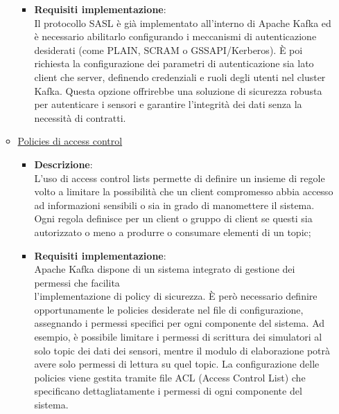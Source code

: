 \documentclass[10pt]{article}
\begin{document}
\begin{itemize}
\begin{itemize}
\begin{itemize}
                    \item \textbf{Requisiti implementazione}:\\
                    Il protocollo SASL è già implementato all'interno di Apache Kafka ed è necessario abilitarlo configurando i meccanismi di autenticazione desiderati (come PLAIN, SCRAM o GSSAPI/Kerberos).
                    È poi richiesta la configurazione dei parametri di autenticazione sia lato client che server, definendo credenziali e ruoli degli utenti nel cluster Kafka.
                    Questa opzione offrirebbe una soluzione di sicurezza robusta per autenticare i sensori e garantire l'integrità dei dati senza la necessità di contratti.

                \end{itemize}

                \item \underline{Policies di access control}
                \begin{itemize}
                    \item \textbf{Descrizione}:\\
                    L'uso di access control lists permette di definire un insieme di regole volto a limitare la possibilità che un client compromesso abbia accesso ad informazioni sensibili o sia in grado di manomettere il sistema.
                    Ogni regola definisce per un client o gruppo di client se questi sia autorizzato o meno a produrre o consumare elementi di un topic;

                    \item \textbf{Requisiti implementazione}:\\
                    Apache Kafka dispone di un sistema integrato di gestione dei permessi che facilita\\ l'implementazione di policy di sicurezza.
                    È però necessario definire opportunamente le policies desiderate nel file di configurazione, assegnando i permessi specifici per ogni componente del sistema.
                    Ad esempio, è possibile limitare i permessi di scrittura dei simulatori al solo topic dei dati dei sensori, mentre il modulo di elaborazione potrà avere solo permessi di lettura su quel topic.
                    La configurazione delle policies viene gestita tramite file ACL (Access Control List) che specificano dettagliatamente i permessi di ogni componente del sistema.


\end{itemize}
\end{itemize}
\end{itemize}
\end{document}
